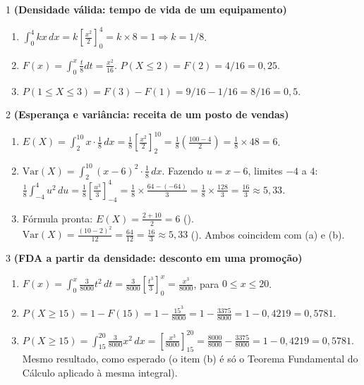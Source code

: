 \documentclass[11pt]{article}
\begin{document}

\begin{questao}{1} \textbf{(Densidade válida: tempo de vida de um equipamento)}
\begin{solucao}
\begin{enumerate}[label=(\alph*)]
  \item $\int_0^4 kx\,dx = k\left[\frac{x^2}{2}\right]_0^4 = k\times 8 = 1 \Rightarrow k=1/8$.
  \item $F(x) = \int_0^x \frac{t}{8}dt = \frac{x^2}{16}$. $P(X\le2)=F(2)=4/16=0{,}25$.
  \item $P(1\le X\le3) = F(3)-F(1) = 9/16-1/16 = 8/16=0{,}5$.
\end{enumerate}
\end{solucao}
\end{questao}

\begin{questao}{2} \textbf{(Esperança e variância: receita de um posto de vendas)}
\begin{solucao}
\begin{enumerate}[label=(\alph*)]
  \item $E(X)=\int_2^{10} x\cdot\frac18\,dx = \frac18\left[\frac{x^2}{2}\right]_2^{10} =
    \frac18\left(\frac{100-4}{2}\right) = \frac18\times48=6$.
  \item $\mathrm{Var}(X) = \int_2^{10}(x-6)^2\cdot\frac18\,dx$. Fazendo $u=x-6$, limites $-4$ a
    $4$: $\frac18\int_{-4}^4 u^2\,du = \frac18\left[\frac{u^3}{3}\right]_{-4}^4 =
    \frac18\times\frac{64-(-64)}{3} = \frac18\times\frac{128}{3} = \frac{16}{3}\approx5{,}33$.
  \item Fórmula pronta: $E(X)=\frac{2+10}{2}=6$ (\checkmark). $\mathrm{Var}(X)=\frac{(10-2)^2}{12}=
    \frac{64}{12}=\frac{16}{3}\approx5{,}33$ (\checkmark). Ambos coincidem com (a) e (b).
\end{enumerate}
\end{solucao}
\end{questao}

\begin{questao}{3} \textbf{(FDA a partir da densidade: desconto em uma promoção)}
\begin{solucao}
\begin{enumerate}[label=(\alph*)]
  \item $F(x) = \int_0^x \frac{3}{8000}t^2\,dt = \frac{3}{8000}\left[\frac{t^3}{3}\right]_0^x =
    \frac{x^3}{8000}$, para $0\le x\le20$.
  \item $P(X\ge15) = 1-F(15) = 1-\frac{15^3}{8000} = 1-\frac{3375}{8000} = 1-0{,}4219 =
    0{,}5781$.
  \item $P(X\ge15) = \int_{15}^{20}\frac{3}{8000}x^2\,dx = \left[\frac{x^3}{8000}\right]_{15}^{20}
    = \frac{8000}{8000}-\frac{3375}{8000} = 1-0{,}4219=0{,}5781$. Mesmo resultado, como esperado
    (o item (b) é só o Teorema Fundamental do Cálculo aplicado à mesma integral).
\end{enumerate}
\end{solucao}
\end{questao}
\end{document}
